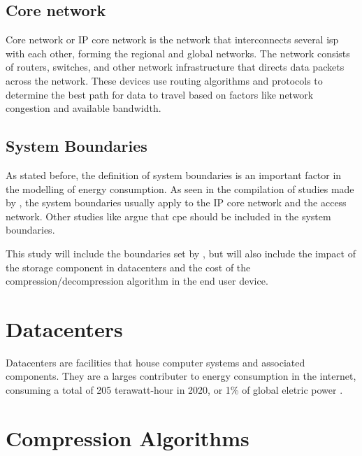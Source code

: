 \subsection{Core network}

Core network or IP core network is the network that interconnects several \ac{isp} with each other, forming the regional and global networks.
The network consists of routers, switches, and other network infrastructure that directs data packets across the network. These devices use routing algorithms and protocols to determine the best path for data to travel based on factors like network congestion and available bandwidth.

\subsection{System Boundaries}

As stated before, the definition of system boundaries is an important factor in the modelling of energy consumption. As seen in the compilation of studies made by \citet{Aslan2018}, the system boundaries usually apply to the IP core network and the access network. Other studies like \citet{Coroama2014} argue that \ac{cpe} should be included in the system boundaries.

This study will include the boundaries set by \citet{Coroama2014}, but will also include the impact of the storage component in datacenters and the cost of the compression/decompression algorithm in the end user device.

\section{Datacenters}

Datacenters are facilities that house computer systems and associated components. They are a larges contributer to energy consumption in the internet, consuming a total of 205 \ac{terawatt-hour} in 2020, or 1\% of global eletric power \citet{IEA2020}.


\section{Compression Algorithms}